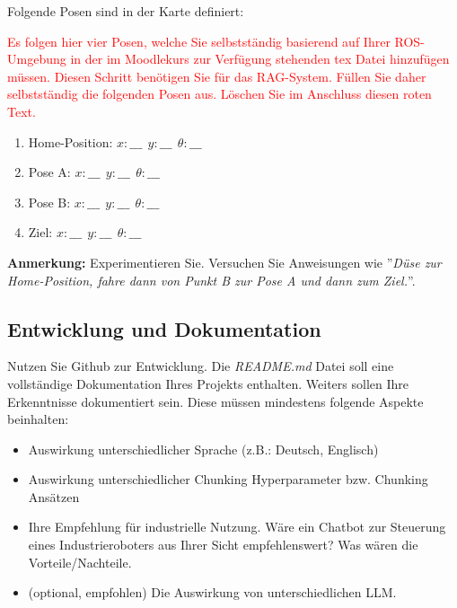 \documentclass{article}
\begin{document}
Folgende Posen sind in der Karte definiert:

\textcolor{red}{Es folgen hier vier Posen, welche Sie selbstständig basierend auf Ihrer ROS-Umgebung in der im Moodlekurs zur Verfügung stehenden tex Datei hinzufügen müssen.
Diesen Schritt benötigen Sie für das RAG-System. Füllen Sie daher selbstständig die folgenden Posen aus. Löschen Sie im Anschluss diesen roten Text.}

\begin{enumerate}
\item Home-Position: $x: \_\_\_ \ \  y: \_\_\_ \ \ \theta: \_\_\_$
\item Pose A: $x: \_\_\_ \ \  y: \_\_\_ \ \ \theta: \_\_\_$
\item Pose B: $x: \_\_\_ \ \  y: \_\_\_ \ \ \theta: \_\_\_$
\item Ziel: $x: \_\_\_ \ \  y: \_\_\_ \ \ \theta: \_\_\_$
\end{enumerate}

\textbf{Anmerkung:} Experimentieren Sie. Versuchen Sie Anweisungen wie ''\textit{Düse zur Home-Position, fahre dann von Punkt B zur Pose A und dann zum Ziel.}''. 

\subsection{Entwicklung und Dokumentation}
Nutzen Sie Github zur Entwicklung.
Die \textit{README.md} Datei soll eine vollständige Dokumentation Ihres Projekts enthalten.
Weiters sollen Ihre Erkenntnisse dokumentiert sein. 
Diese müssen mindestens folgende Aspekte beinhalten:
\begin{itemize}
    \item Auswirkung unterschiedlicher Sprache (z.B.: Deutsch, Englisch)
    \item Auswirkung unterschiedlicher Chunking Hyperparameter bzw. Chunking Ansätzen
    \item Ihre Empfehlung für industrielle Nutzung. Wäre ein Chatbot zur Steuerung eines Industrieroboters aus Ihrer Sicht empfehlenswert? Was wären die Vorteile/Nachteile.
    \item (optional, empfohlen) Die Auswirkung von unterschiedlichen LLM.
\end{itemize}
\end{document}
